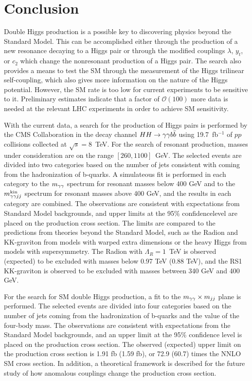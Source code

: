 
\chapter{Conclusion\label{ch:conclusion}}

Double Higgs production is a possible key to discovering physics beyond the Standard Model.
This can be accomplished either through the production of a new resonance decaying to
a Higgs pair or through the modified couplings $\lambda$, $y_t$, or $c_2$
which change the nonresonant production of a Higgs pair. The search also provides a means
to test the SM through the measurement of the Higgs trilinear self-coupling, which also gives
more information on the nature of the Higgs potential. However, the SM rate is too low
for current experiments to be sensitive to it. Preliminary estimates indicate that a factor of
$\mathcal{O}(100)$ more data is needed at the relevant LHC experiments in order to achieve
SM sensitivity.

With the current data, a search for the production of Higgs pairs is performed
by the CMS Collaboration in the decay channel $HH \rightarrow \gamma\gamma b\bar{b}$ using 19.7~fb$^{-1}$
of $pp$ collisions collected at $\sqrt{s} = 8$~TeV.
For the search of resonant production, masses under consideration are on the range 
$[260, 1100]$~GeV. The selected events are divided into two categories based on the number of jets
consistent with coming from the hadronization of b-quarks.
A simulateous fit is performed in each category to the $m_{\gamma\gamma}$ spectrum for resonant masses
below 400 GeV and to the $m_{\gamma\gamma jj}^{\rm kin}$ spectrum for resonant masses above 400 GeV, and the results
in each category are combined. The observations are consistent with expectations from Standard
Model backgrounds, and upper limits at the 95\% confidencelevel are placed on the production
cross section. The limits are compared to the predictions from theories beyond the Standard Model,
such as the Radion and KK-graviton from models with warped extra dimensions or the heavy Higgs
from models with supersymmetry. The Radion with $\Lambda_R = 1$~TeV is observed (expected) to be
excluded with masses below 0.97 TeV (0.88 TeV), and the RS1 KK-graviton is observed to be
excluded with masses between 340 GeV and 400 GeV.

For the search for SM double Higgs production, a fit to the $m_{\gamma\gamma} \times m_{jj}$ plane 
is performed. The selected events are divided into four categories based on the number of jets
coming from the hadronization of b-quarks and the value of the four-body mass.
The observations are consistent with expectations from the Standard Model backgrounds, and an
upper limit at the 95\% confidence level is placed on the production cross section.
The observed (expected) upper limit on the production cross section is 1.91 fb (1.59 fb),
or 72.9 (60.7) times the NNLO SM cross section. In addition, a theoretical framework is described
for the future study of how anomalous couplings change the production cross section.
